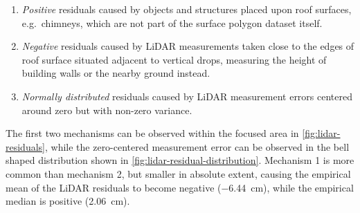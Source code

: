 \begin{enumerate}
  \item \emph{Positive} residuals caused by objects and structures placed upon roof surfaces, e.g.\ chimneys, which are not part of the surface polygon dataset itself.
  \item \emph{Negative} residuals caused by LiDAR measurements taken close to the edges of roof surface situated adjacent to vertical drops, measuring the height of building walls or the nearby ground instead.
  \item \emph{Normally distributed} residuals caused by LiDAR measurement errors centered around zero but with non-zero variance.
\end{enumerate}
The first two mechanisms can be observed within the focused area in \cref{fig:lidar-residuals}, while the zero-centered measurement error can be observed in the bell shaped distribution shown in \cref{fig:lidar-residual-distribution}.
Mechanism 1 is more common than mechanism 2, but smaller in absolute extent, causing the empirical mean of the LiDAR residuals to become negative (\SI{-6.44}{\centi\meter}), while the empirical median is positive (\SI{2.06}{\centi\meter}).

